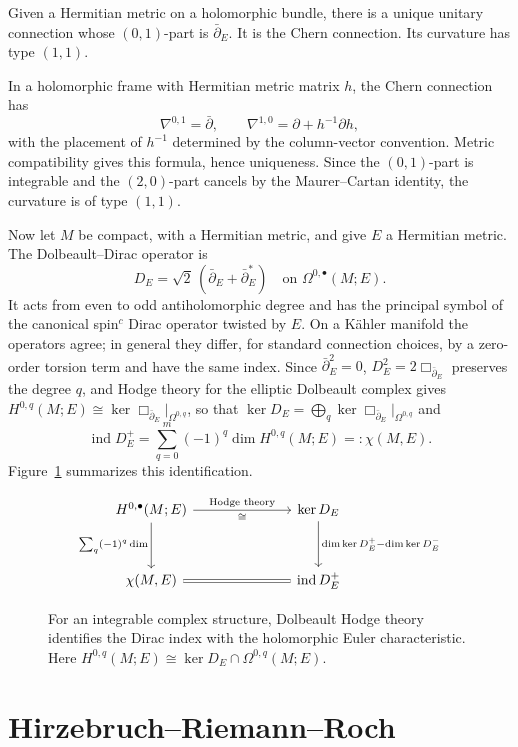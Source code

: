 \documentclass[11pt,oneside,reqno]{book}
\DeclareMathOperator{\ind}{ind}
\theoremstyle{plain}
\theoremstyle{definition}
\theoremstyle{remark}
\begin{document}
Given a Hermitian metric on a holomorphic bundle, there is a unique unitary
connection whose \((0,1)\)-part is \(\bar\partial_E\). It is the Chern
connection. Its curvature has type \((1,1)\).

In a holomorphic frame with Hermitian metric matrix \(h\), the Chern
connection has
\[
 \nabla^{0,1}=\bar\partial,
 \qquad
 \nabla^{1,0}=\partial+h^{-1}\partial h,
\]
with the placement of \(h^{-1}\) determined by the column-vector
convention. Metric compatibility gives this formula, hence uniqueness.
Since the \((0,1)\)-part is integrable and the \((2,0)\)-part cancels by
the Maurer--Cartan identity, the curvature is of type \((1,1)\).

Now let \(M\) be compact, with a Hermitian metric, and give \(E\) a
Hermitian metric.  The Dolbeault--Dirac operator is
\[
 D_E=\sqrt2\,(\bar\partial_E+\bar\partial_E^*)
 \quad\text{on }\Omega^{0,\bullet}(M;E).
\]
It acts from even to odd antiholomorphic degree and has the principal symbol
of the canonical spin\(^{c}\) Dirac operator twisted by \(E\). On a Kähler
manifold the operators agree; in general they differ, for standard
connection choices, by a zero-order torsion term and have the same index.
Since \(\bar\partial_E^2=0\), \(D_E^2=2\Box_{\bar\partial_E}\) preserves
the degree \(q\), and Hodge theory for the elliptic Dolbeault complex gives
\(H^{0,q}(M;E)\cong\ker\Box_{\bar\partial_E}|_{\Omega^{0,q}}\), so that
\(\ker D_E=\bigoplus_q\ker\Box_{\bar\partial_E}|_{\Omega^{0,q}}\) and
\[
 \ind D_E^+
 =
 \sum_{q=0}^m(-1)^q
 \dim H^{0,q}(M;E)
 =:\chi(M,E).
\]
Figure~\ref{fig:dolbeault} summarizes this identification.

\begin{figure}[htbp]
\centering
\[
\begin{tikzcd}[column sep=7em,row sep=3.2em]
 H^{0,\bullet}(M;E)
   \arrow[r,"\cong"',"\text{Hodge theory}"]
   \arrow[d,"\sum_q(-1)^q\dim"']
 & \ker D_E
   \arrow[d,"\dim\ker D_E^+-\dim\ker D_E^-"]\\
 \chi(M,E)\arrow[r,equal]
 & \operatorname{ind}D_E^+
\end{tikzcd}
\]
\caption[Dolbeault cohomology and the Dirac index]{For an integrable complex structure, Dolbeault Hodge theory
identifies the Dirac index with the holomorphic Euler characteristic.
Here \(H^{0,q}(M;E)\cong\ker D_E\cap\Omega^{0,q}(M;E)\).}
\label{fig:dolbeault}
\end{figure}

\section{Hirzebruch--Riemann--Roch}
\end{document}
